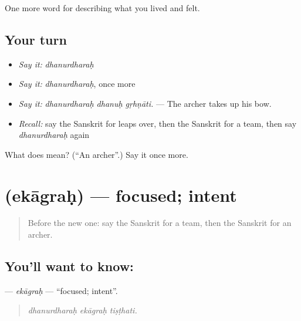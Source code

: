\begin{grammarlens}[title={What you've built}]
One more word for describing what you lived and felt.
\end{grammarlens}

\subsection*{Your turn}
\begin{itemize}
\raggedright
  \item \emph{Say it:} \emph{dhanurdharaḥ}
  \item \emph{Say it:} \emph{dhanurdharaḥ}, once more
  \item \emph{Say it:} \emph{dhanurdharaḥ dhanuḥ gṛhṇāti.} — The archer takes up his bow.
  \item \emph{Recall:} say the Sanskrit for leaps over, then the Sanskrit for a team, then say \emph{dhanurdharaḥ} again
\end{itemize}

\begin{tcolorbox}[breakable,colback=teal!4,colframe=teal!35!black,title={Before you move on}]
What does  mean? (\textquotedblleft{}An archer\textquotedblright{}.) Say it once more.
\end{tcolorbox}
\section[\texorpdfstring{\sk{एकाग्रः} (ekāgraḥ)}{एकाग्रः (ekāgraḥ)}]{ (ekāgraḥ) — focused; intent}

\label{lesson:SA-C527-ekagrah}



\begin{quote}
Before the new one: say the Sanskrit for a team, then the Sanskrit for an archer.
\end{quote}

\subsection*{You'll want to know: }
\textbf{} — \emph{ekāgraḥ} — \textquotedblleft{}focused; intent\textquotedblright{}.

\begin{quote}
  
\end{quote}

\begin{quote}
\emph{dhanurdharaḥ ekāgraḥ tiṣṭhati.}
\end{quote}

